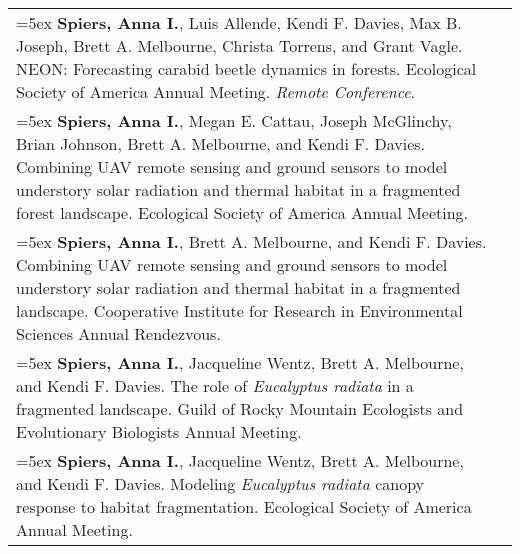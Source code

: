 \begin{longtable}{@{}>{\raggedright}p{5.25in} @{} >{\raggedleft}X@{}}
\hangindent=5ex \textbf{Spiers, Anna I.}, Luis Allende, Kendi F. Davies, Max B. Joseph, Brett A. Melbourne, Christa Torrens, and Grant Vagle. NEON: Forecasting carabid beetle dynamics in forests. Ecological Society of America Annual Meeting. \emph{Remote Conference}. &  2020 \tabularnewline %

\hangindent=5ex \textbf{Spiers, Anna I.}, Megan E. Cattau, Joseph McGlinchy, Brian Johnson, Brett A. Melbourne, and Kendi F. Davies.  Combining UAV remote sensing and ground sensors to model understory solar radiation and thermal habitat in a fragmented forest landscape. Ecological Society of America Annual Meeting. &  2019 \tabularnewline %

\hangindent=5ex \textbf{Spiers, Anna I.}, Brett A. Melbourne, and Kendi F. Davies.  Combining UAV remote sensing and ground sensors to model understory solar radiation and thermal habitat in a fragmented landscape. Cooperative Institute for Research in Environmental Sciences Annual Rendezvous. &  2019 \tabularnewline %

\hangindent=5ex \textbf{Spiers, Anna I.}, Jacqueline Wentz, Brett A. Melbourne, and Kendi F. Davies.  The role of \emph{Eucalyptus radiata} in a fragmented landscape. Guild of Rocky Mountain Ecologists and Evolutionary Biologists Annual Meeting. &  2018 \tabularnewline %

\hangindent=5ex \textbf{Spiers, Anna I.}, Jacqueline Wentz, Brett A. Melbourne, and Kendi F. Davies.  Modeling \emph{Eucalyptus radiata} canopy response to habitat fragmentation. Ecological Society of America Annual Meeting. &  2018 \tabularnewline %

\end{longtable}
